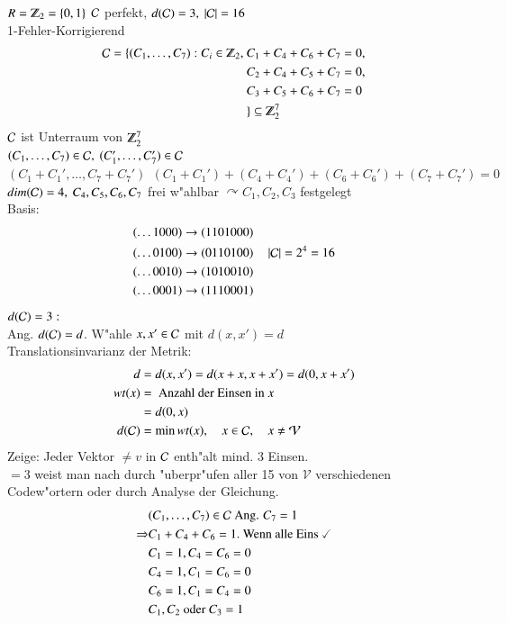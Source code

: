 $R=\Z_2=\lbrace 0,1 \rbrace$ $\mathcal{C}$ perfekt, $d(\mathcal{C})=3,\ \left| \mathcal{C} \right| = 16$ \\
1-Fehler-Korrigierend
\begin{align*}
\Code = \lbrace (C_1,\ldots,C_7) : C_i \in \Z_2,\ &C_1 + C_4 + C_6 + C_7 = 0,\\
										&C_2 + C_4 + C_5 + C_7 = 0,\\
										&C_3 + C_5 + C_6 + C_7 = 0\\
										 &\rbrace \subseteq \Z_2^7
\end{align*}
$\mathcal{C}$ ist Unterraum von $\Z_2^7$ \\
$(C_1,\ldots,C_7) \in \Code,\ (C_1',\ldots,C_7') \in \Code$ \\
$(C_1 + C_1',\ldots,C_7+C_7')\ \ (C_1+C_1') + (C_4+C_4') + (C_6+C_6') + (C_7+C_7') = 0$ \\
$dim(\mathcal{C})=4,\ C_4,C_5,C_6,C_7$ frei w"ahlbar $\curvearrowright C_1,C_2,C_3$ festgelegt \\
Basis:
\begin{align*}
	&(\ldots 1000) \rightarrow (1101000) \\
	&(\ldots 0100) \rightarrow (0110100) \quad \left| \mathcal{C} \right| =2^4 =16\\
	&(\ldots 0010) \rightarrow (1010010) \\
	&(\ldots 0001) \rightarrow (1110001)
\end{align*}
$d(\mathcal{C})=3:$\\
Ang. $d(\mathcal{C})=d$. W"ahle $x,x' \in \mathcal{C}$ mit $d(x,x')=d$\\
Translationsinvarianz der Metrik: \\
\begin{align*}
	d &=d(x,x')=d(x+x,x+x')=d(0,x+x') \\
	wt(x) &= \text{ Anzahl der Einsen in } x \\
	&= d(0,x)\\
	d(\mathcal{C}) &= \min wt(x),\quad x \in \mathcal{C},\quad x \neq \mathcal{V}
\end{align*}
Zeige: Jeder Vektor $\neq v$ in $\mathcal{C}$ enth"alt mind. 3 Einsen.\\
$= 3$ weist man nach durch "uberpr"ufen aller 15 von $\mathcal{V}$ verschiedenen Codew"ortern oder durch Analyse der Gleichung. 
\begin{align*}
	&(C_1,\ldots,C_7) \in \Code \text{ Ang. } C_7=1 \\
	\Rightarrow &C_1+C_4+C_6=1. \text{ Wenn alle Eins } \checked \\
	&C_1=1,C_4=C_6=0\\
	&C_4=1,C_1=C_6=0\\
	&C_6=1,C_1=C_4=0\\
	&C_1, C_2\text{ oder } C_3 = 1
\end{align*}
